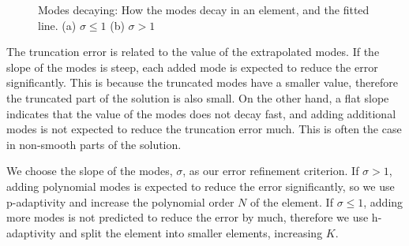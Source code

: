 \begin{figure}[H]
	\centering
	\hfill
	\caption{Modes decaying: How the modes decay in an element, and the fitted line. (a) $\sigma \leqslant 1$ (b) $\sigma > 1$}
	\label{fig:decaying_modes}
\end{figure}

The truncation error is related to the value of the extrapolated modes. If the slope of the modes is
steep, each added mode is expected to reduce the error significantly. This is because the truncated modes
have a smaller value, therefore the truncated part of the solution is also small. On the other hand,
a flat slope indicates that the value of the modes does not decay fast, and adding additional modes
is not expected to reduce the truncation error much. This is often the case in non-smooth parts of
the solution.

We choose the slope of the modes, $\sigma$, as our error refinement criterion. If $\sigma > 1$,
adding polynomial modes is expected to reduce the error significantly, so we use p-adaptivity and
increase the polynomial order $N$ of the element. If $\sigma \leqslant 1$, adding more modes is not
predicted to reduce the error by much, therefore we use h-adaptivity and split the element into
smaller elements, increasing $K$.

